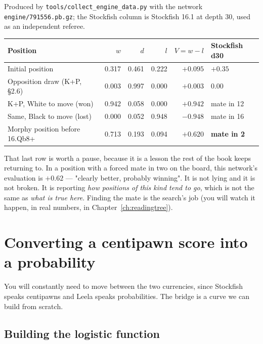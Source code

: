 \begin{realdata}[title={Real engine output: five positions, four currencies}]
Produced by \texttt{tools/collect\_engine\_data.py} with the network
\texttt{engine/791556.pb.gz}; the Stockfish column is Stockfish 16.1 at depth 30, used as an
independent referee.

\begin{center}\small
\begin{tabular}{@{}lrrrrl@{}}
\toprule
Position & $w$ & $d$ & $l$ & $V = w-l$ & Stockfish d30 \\
\midrule
Initial position                 & 0.317 & 0.461 & 0.222 & $+0.095$ & $+0.35$ \\
Opposition draw (K+P, §2.6)      & 0.003 & 0.997 & 0.000 & $+0.003$ & $0.00$ \\
K+P, White to move (won)         & 0.942 & 0.058 & 0.000 & $+0.942$ & mate in 12 \\
Same, Black to move (lost)       & 0.000 & 0.052 & 0.948 & $-0.948$ & mate in 16 \\
Morphy position before 16.Qb8+   & 0.713 & 0.193 & 0.094 & $+0.620$ & \textbf{mate in 2} \\
\bottomrule
\end{tabular}
\end{center}
\end{realdata}

That last row is worth a pause, because it is a lesson the rest of the book keeps returning
to. In a position with a forced mate in two on the board, this network's evaluation is
$+0.62$ --- "clearly better, probably winning". It is not lying and it is not broken. It is
reporting \emph{how positions of this kind tend to go}, which is not the same as
\emph{what is true here}. Finding the mate is the search's job (you will watch it happen, in
real numbers, in Chapter~\ref{ch:readingtree}).

\section{Converting a centipawn score into a probability}

You will constantly need to move between the two currencies, since Stockfish speaks
centipawns and Leela speaks probabilities. The bridge is a curve we can build from scratch.

\subsection{Building the logistic function}

